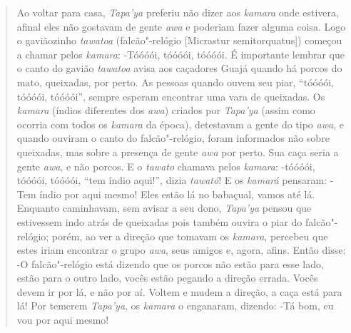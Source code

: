 \begin{quote}
Ao voltar para casa, \emph{Tapa'ya} preferiu não dizer aos \emph{kamara}
onde estivera, afinal eles não gostavam de gente \emph{awa} e poderiam
fazer alguma coisa. Logo o gaviãozinho \emph{tawatoa} (falcão"-relógio
{[}Micrastur semitorquatus{]}) começou a chamar pelos \emph{kamara}:
-Tóóóói, tóóóói, tóóóói. É importante lembrar que o canto do gavião
\emph{tawatoa} avisa aos caçadores Guajá quando há porcos do mato,
queixadas, por perto. As pessoas quando ouvem seu piar, ``tóóóói,
tóóóói, tóóóói'', sempre esperam encontrar uma vara de queixadas. Os
\emph{kamara} (índios diferentes dos \emph{awa}) criados por
\emph{Tapa'ya} (assim como ocorria com todos os \emph{kamara} da época),
detestavam a gente do tipo \emph{awa}, e quando ouviram o canto do
falcão"-relógio, foram informados não sobre queixadas, mas sobre a
presença de gente \emph{awa} por perto. Sua caça seria a gente
\emph{awa}, e não porcos. E o \emph{tawato} chamava pelos \emph{kamara}:
-tóóóói, tóóóói, tóóóói, ``tem índio aqui!'', dizia \emph{tawató}! E os
\emph{kamará} pensaram: -Tem índio por aqui mesmo! Eles estão lá no
babaçual, vamos até lá. Enquanto caminhavam, sem avisar a seu dono,
\emph{Tapa'ya} pensou que estivessem indo atrás de queixadas pois também
ouvira o piar do falcão"-relógio; porém, ao ver a direção que tomavam os
\emph{kamara}, percebeu que estes iriam encontrar o grupo \emph{awa},
seus amigos e, agora, afins. Então disse: -O falcão"-relógio está dizendo
que os porcos não estão para esse lado, estão para o outro lado, vocês
estão pegando a direção errada. Vocês devem ir por lá, e não por aí.
Voltem e mudem a direção, a caça está para lá! Por temerem
\emph{Tapa'ya}, os \emph{kamara} o enganaram, dizendo: -Tá bom, eu vou
por aqui mesmo!


\end{quote}
